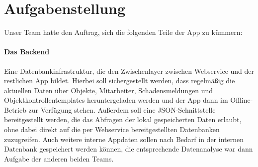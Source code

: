 \documentclass[12pt]{article}
\begin{document}
\begin{abstract}
Im Folgenden geht es um die Implementierung einer Hausmeister-App, von uns FacilityManager getauft, mit der Schadensmeldungen verfasst und abgeschickt, Objektkontrollen anhand von Checklisten durchgeführt und dokumentiert und Informationen über Objekte abgerufen werden können.
\paragraph{Fachlicher Aspekt}
Zu dieser App existierte anfangs bereits ein Prototyp, neu ist allerdings die Zusammenführung aller Funktionen in einer App und die Möglichkeit, Objektkontrollen mithilfe der App durchzuführen. Außerdem war vorgegeben, dass die neue Auflage der Hausmeister-App auch offline funktioniert, was durch eine interne Wrapper-Datenbank für die per RESTFul Webservice erreichbare bereits vorhandene Datenbank realisiert werden sollte. Mehr dazu in Abschnitt \ref{sec:aufg}.
\paragraph{Technologie}
Damit die App auf möglichst vielen Plattformen läuft, haben wir uns am Anfang des Projekts für die Umsetzung mit dem Ionic-Framework entschieden. Dieses ermöglichte uns ein Arbeiten auf hohem Abstraktionsniveau bei gleichzeitigem Handeln der Implementierung auf Android, iOS, als WebApp, Electronapp, etc.
\paragraph{Organisation}
Zu Beginn wurde das Projekt auf drei Arbeitsteams aufgeteilt, ein Team für das Backend, ein Team für den Schadensmeldungsteil der GUI und ein Team für den Objektkontrollenteil der GUI. Hier soll es um den Beitrag des ersten dieser Teams gehen.
\end{abstract}

\section{Aufgabenstellung}\label{sec:aufg} 
Unser Team hatte den Auftrag, sich die folgenden Teile der App zu kümmern:
\paragraph{Das Backend} Eine Datenbankinfrastruktur, die den Zwischenlayer zwischen Webservice und der restlichen App bildet. Hierbei soll sichergestellt werden, dass regelmäßig die aktuellen Daten über Objekte, Mitarbeiter, Schadensmeldungen und Objektkontrollentemplates heruntergeladen werden und der App dann im Offline-Betrieb zur Verfügung stehen. Außerdem soll eine JSON-Schnittstelle bereitgestellt werden, die das Abfragen der lokal gespeicherten Daten erlaubt, ohne dabei direkt auf die per Webservice bereitgestellten Datenbanken zuzugreifen. Auch weitere interne Appdaten sollen nach Bedarf in der internen Datenbank gespeichert werden können, die entsprechende Datenanalyse war dann Aufgabe der anderen beiden Teams.
\end{document}
